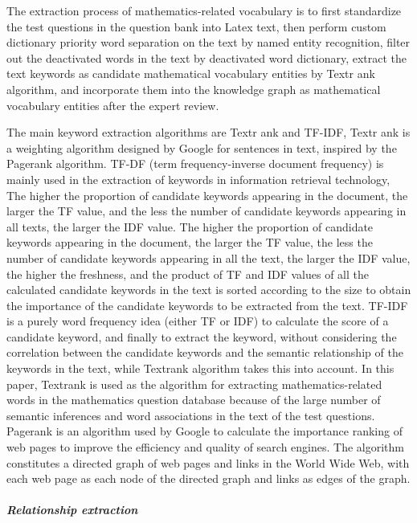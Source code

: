 \documentclass[11pt,en]{elegantpaper}
\begin{document}
The extraction process of mathematics-related vocabulary is to first standardize the test questions in the question bank into Latex text, then perform custom dictionary priority word separation on the text by named entity recognition, filter out the deactivated words in the text by deactivated word dictionary, extract the text keywords as candidate mathematical vocabulary entities by Textr ank algorithm, and incorporate them into the knowledge graph as mathematical vocabulary entities after the expert review.

The main keyword extraction algorithms are Textr ank and TF-IDF, Textr ank is a weighting algorithm designed by Google for sentences in text, inspired by the Pagerank algorithm. TF-DF (term frequency-inverse document frequency) is mainly used in the extraction of keywords in information retrieval technology, The higher the proportion of candidate keywords appearing in the document, the larger the TF value, and the less the number of candidate keywords appearing in all texts, the larger the IDF value. The higher the proportion of candidate keywords appearing in the document, the larger the TF value, the less the number of candidate keywords appearing in all the text, the larger the IDF value, the higher the freshness, and the product of TF and IDF values of all the calculated candidate keywords in the text is sorted according to the size to obtain the importance of the candidate keywords to be extracted from the text.
TF-IDF is a purely word frequency idea (either TF or IDF) to calculate the score of a candidate keyword, and finally to extract the keyword, without considering the correlation between the candidate keywords and the semantic relationship of the keywords in the text, while Textrank algorithm takes this into account. In this paper, Textrank is used as the algorithm for extracting mathematics-related words in the mathematics question database because of the large number of semantic inferences and word associations in the text of the test questions.
Pagerank is an algorithm used by Google to calculate the importance ranking of web pages to improve the efficiency and quality of search engines. The algorithm constitutes a directed graph of web pages and links in the World Wide Web, with each web page as each node of the directed graph and links as edges of the graph.

\subparagraph{Relationship extraction}
\end{document}
